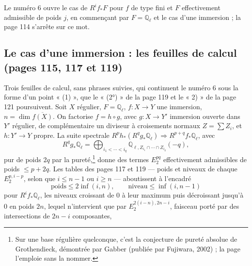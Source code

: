 \documentclass[11pt,a4paper]{article}
\begin{document}
Le numéro 6 ouvre le cas de $R^{i}f_{*}F$ pour $f$ de type fini et $F$
effectivement admissible de poids $j$, en commençant par $F = \mathbb{Q}_{\ell}$ et
le cas d'une immersion ; la page 114 s'arrête sur ce mot.

\subsection*{Le cas d'une immersion : les feuilles de calcul (pages 115, 117 et 119)}

Trois feuilles de calcul, sans phrases suivies, qui continuent le numéro 6 sous
la forme d'un point « (1) », que le « (2°) » de la page 119 et le « 2) » de la page
121 poursuivent. Soit $X$ régulier, $F = \mathbb{Q}_{\ell}$, $f \colon X \to Y$ une
immersion, $n = \dim \overline{f(X)}$. On factorise $f = h \circ g$, avec $g \colon X
\to Y'$ immersion ouverte dans $Y'$ régulier, de complémentaire un diviseur à
croisements normaux $Z = \sum Z_{i}$, et $h \colon Y' \to Y$ propre. La suite
spectrale $R^{p}h_{*}(R^{q}g_{*}\mathbb{Q}_{\ell}) \Rightarrow R^{p+q}f_{*}
\mathbb{Q}_{\ell}$, avec
\[
R^{q}g_{*}\mathbb{Q}_{\ell} = \bigoplus_{i_{1} < \cdots < i_{q}}
\mathbb{Q}_{\ell, Z_{i_{1}} \cap \cdots \cap Z_{i_{q}}}(-q) ,
\]
pur de poids $2q$ par la pureté,\footnote{Sur une base régulière quelconque,
c'est la conjecture de pureté absolue de Grothendieck, démontrée par Gabber
(publiée par Fujiwara, 2002) ; la page l'emploie sans la nommer.} donne des
termes $E_{2}^{pq}$ effectivement admissibles de poids $\leqslant p + 2q$. Les
tables des pages 117 et 119 --- poids et niveaux de chaque $E_{2}^{p,i-p}$, selon
que $i \leqslant n-1$ ou $i \geqslant n$ --- aboutissent à l'encadré
\[
\text{poids} \leqslant 2\inf(i, n) , \qquad \text{niveau} \leqslant \inf(i, n-1)
\]
pour $R^{i}f_{*}\mathbb{Q}_{\ell}$, les niveaux croissant de $0$ à leur maximum puis
décroissant jusqu'à $0$ en poids $2n$, lequel n'intervient que par
$E_{2}^{2(i-n), 2n-i}$, faisceau porté par des intersections de $2n-i$ composantes,
\end{document}
